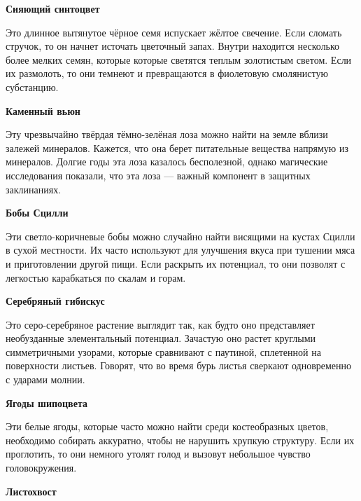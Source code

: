 \documentclass[a4paper, 9pt, twocolumn]{book}
\begin{document}
	\medspace
	
	\noindent \textbf{Сияющий синтоцвет}
	
	\smallskip
	
	\noindent Это длинное вытянутое чёрное семя испускает жёлтое свечение. Если сломать стручок, то он начнет источать цветочный запах. Внутри находится несколько более мелких семян, которые  которые светятся теплым золотистым светом. Если их размолоть, то они темнеют и превращаются в фиолетовую смолянистую субстанцию.
	
	\medspace
	
	\noindent \textbf{Каменный вьюн}
	
	\smallskip
	
	\noindent Эту чрезвычайно твёрдая тёмно-зелёная лоза можно найти на земле вблизи залежей минералов. Кажется, что она берет питательные вещества напрямую из минералов. Долгие годы эта лоза казалось бесполезной, однако магические исследования показали, что эта лоза --- важный компонент в защитных заклинаниях.
	
	\medspace
	
	\noindent \textbf{Бобы Сцилли}
	
	\noindent Эти светло-коричневые бобы можно случайно найти висящими на кустах Сцилли в сухой местности. Их часто используют для улучшения вкуса при тушении мяса и приготовлении другой пищи. Если раскрыть их потенциал, то они позволят с легкостью карабкаться по скалам и горам.
	
	\medspace
	
	\noindent \textbf{Серебряный гибискус}
	
	\smallskip
	
	\noindent Это серо-серебряное растение выглядит так, как будто оно представляет необузданные элементальный потенциал. Зачастую оно растет круглыми симметричными узорами, которые сравнивают с паутиной, сплетенной на поверхности листьев. Говорят, что во время бурь листья сверкают одновременно с ударами молнии.
	
	\medspace
	
	\noindent \textbf{Ягоды шипоцвета}
	
	\smallskip
	
	\noindent Эти белые ягоды, которые часто можно найти среди костеобразных цветов, необходимо собирать аккуратно, чтобы не нарушить хрупкую структуру. Если их проглотить, то они немного утолят голод и вызовут небольшое чувство головокружения.
	
	\medspace
	
	\noindent \textbf{Листохвост}
	
\end{document}

